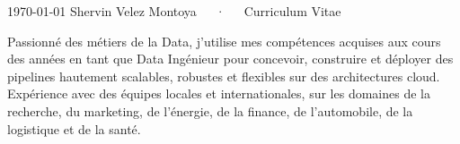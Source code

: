 \documentclass[11pt, a4paper]{awesome-cv}
\begin{document}
\makecvheader

\makecvfooter
{\today}
{Shervin Velez Montoya~~~·~~~Curriculum Vitae}
{}


\begin{cvparagraph}
    Passionné des métiers de la Data, j'utilise mes compétences acquises aux cours des années en tant que Data Ingénieur pour concevoir, construire et déployer des pipelines hautement scalables, robustes et flexibles sur des architectures cloud.
    Expérience avec des équipes locales et internationales, sur les domaines de la recherche, du marketing, de l'énergie, de la finance, de l'automobile, de la logistique et de la santé.
\end{cvparagraph}





\end{document}
